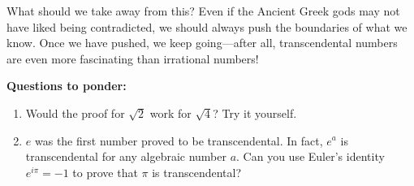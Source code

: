 \documentclass{article}
\begin{document}
What should we take away from this? Even if the Ancient Greek gods may not have liked being contradicted, we should always push the boundaries of what we know. Once we have pushed, we keep going---after all, transcendental numbers are even more fascinating than irrational numbers!

\bigskip

\noindent\textbf{Questions to ponder:}
\begin{enumerate}
    \item Would the proof for $\sqrt{2}$ work for $\sqrt{4}$? Try it yourself.
    \item $e$ was the first number proved to be transcendental. In fact, $e^a$ is transcendental for any algebraic number $a$. Can you use Euler's identity $e^{i\pi} = -1$ to prove that $\pi$ is transcendental?
\end{enumerate}
\end{document}
